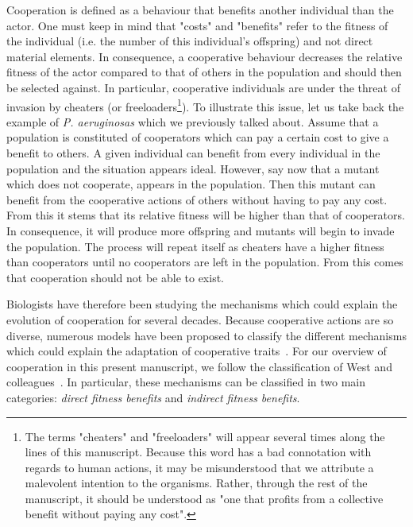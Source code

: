     Cooperation is defined as a behaviour that benefits another individual than the actor. One must keep in mind that "costs" and "benefits" refer to the fitness of the individual (i.e. the number of this individual's offspring) and not direct material elements. In consequence, a cooperative behaviour decreases the relative fitness of the actor compared to that of others in the population and should then be selected against. In particular, cooperative individuals are under the threat of invasion by cheaters (or freeloaders\footnote{The terms "cheaters" and "freeloaders" will appear several times along the lines of this manuscript. Because this word has a bad connotation with regards to human actions, it may be misunderstood that we attribute a malevolent intention to the organisms. Rather, through the rest of the manuscript, it should be understood as "one that profits from a collective benefit without paying any cost".}). To illustrate this issue, let us take back the example of \emph{P. aeruginosas} which we previously talked about. Assume that a population is constituted of cooperators which can pay a certain cost to give a benefit to others. A given individual can benefit from every individual in the population and the situation appears ideal. However, say now that a mutant which does not cooperate, appears in the population. Then this mutant can benefit from the cooperative actions of others without having to pay any cost. From this it stems that its relative fitness will be higher than that of cooperators. In consequence, it will produce more offspring and mutants will begin to invade the population. The process will repeat itself as cheaters have a higher fitness than cooperators until no cooperators are left in the population. From this comes that cooperation should not be able to exist. 

    Biologists have therefore been studying the mechanisms which could explain the evolution of cooperation for several decades. Because cooperative actions are so diverse, numerous models have been proposed to classify the different mechanisms which could explain the adaptation of cooperative traits~\parencite{Dugatkin2002, Keller2006, Bergmuller2007a, West2007}. For our overview of cooperation in this present manuscript, we follow the classification of West and colleagues~\parencite{West2007a}. In particular, these mechanisms can be classified in two main categories: \emph{direct fitness benefits} and \emph{indirect fitness benefits}.


